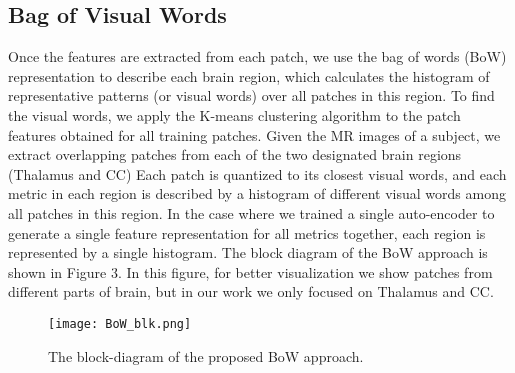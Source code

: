 \documentclass[letterpaper, 10 pt, conference]{ieeeconf}  %
\begin{document}
\subsection{Bag of Visual Words}
Once the features are extracted from each patch, 
we use the bag of words (BoW) representation  \cite{bow1} to describe each brain region, which calculates the histogram of representative patterns (or visual words) over all patches in this region.
To find the visual words, we apply the K-means clustering algorithm to the patch features obtained for all training patches. Given the MR images of a subject, we extract overlapping patches from each of the two designated brain regions (Thalamus and CC) Each patch is quantized to its closest visual words, and each metric in each region is described by a histogram of different visual words among all patches in this region. In the case where we trained a single auto-encoder to generate a single feature representation for all metrics together, each region is represented by a single histogram.
The block diagram of the BoW approach is shown in Figure 3.
In this figure, for better visualization we show patches from different parts of brain, but in our work we only focused on Thalamus and CC.
\begin{figure}[h]
\begin{center}
    \texttt{[image: BoW\_blk.png]}
\end{center}
  \caption{The block-diagram of the proposed BoW approach. }
\end{figure}
\end{document}
